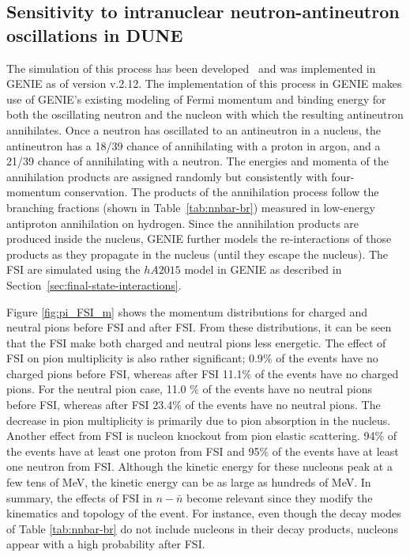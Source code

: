 \subsection{Sensitivity to intranuclear neutron-antineutron oscillations in DUNE}
\label{subsec:nonaccel-nnbar-dunesensitivity}

The simulation of this process has been developed~\cite{Hewes:2017xtr} and was implemented in GENIE as of version v.2.12. The implementation of this process in GENIE makes use of GENIE's existing modeling of Fermi momentum and binding energy for both the oscillating neutron and the nucleon with which the resulting antineutron annihilates.   Once a neutron has oscillated to an antineutron in a nucleus, the antineutron has a 18/39 chance of annihilating with a proton in argon, and a 21/39 chance of annihilating with a neutron. The energies and momenta of the annihilation products are assigned randomly but consistently with four-momentum conservation. The products of the annihilation process follow the branching fractions (shown in Table~\ref{tab:nnbar-br}) measured in low-energy antiproton annihilation on hydrogen.
Since the annihilation products are produced inside the nucleus, GENIE further models the re-interactions of those products as they propagate in the nucleus (until they escape the nucleus).  The FSI are simulated using the $hA2015$ model in GENIE as described in Section~\ref{sec:final-state-interactions}.

Figure \ref{fig:pi_FSI_m} shows the momentum distributions for charged and neutral pions before FSI and after FSI. From these distributions, it can be seen that the FSI make both charged and neutral pions less energetic.  The effect of FSI on pion multiplicity is also rather significant; 0.9$\%$ of the events have no charged pions before FSI, whereas after FSI 11.1$\%$ of the events have no charged pions. For the neutral pion case, 11.0 $\%$ of the events have no neutral pions before FSI, whereas after FSI 23.4$\%$ of the events have no neutral pions. The decrease in pion multiplicity is primarily due to pion absorption in the nucleus. Another effect from FSI is nucleon knockout from pion elastic scattering. 94$\%$ of the events have at least one proton from FSI and 95$\%$ of the events have at least one neutron from FSI. Although the kinetic energy for these nucleons peak at a few tens of MeV, the kinetic energy can be as large as hundreds of MeV.  In summary, the effects of FSI in $n-\bar{n}$ become relevant since they modify the kinematics and topology of the event. For instance, even though the decay modes of Table \ref{tab:nnbar-br} do not include nucleons in their decay products, nucleons appear with a high probability after FSI.

